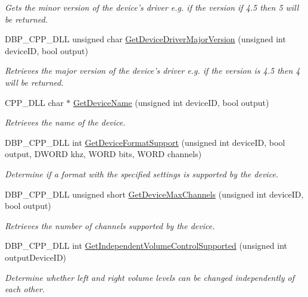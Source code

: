 \begin{DoxyCompactItemize}
\begin{DoxyCompactList}\small\item\em Gets the minor version of the device's driver e.g. if the version if 4.5 then 5 will be returned. \item\end{DoxyCompactList}\item 
DBP\_\-CPP\_\-DLL unsigned char \hyperlink{namespacemn_sound_a344981464c4ba19f43a4c2310a1369d5}{GetDeviceDriverMajorVersion} (unsigned int deviceID, bool output)
\begin{DoxyCompactList}\small\item\em Retrieves the major version of the device's driver e.g. if the version is 4.5 then 4 will be returned. \item\end{DoxyCompactList}\item 
CPP\_\-DLL char $\ast$ \hyperlink{namespacemn_sound_aaa57b089a6e0a2fabce97803657feda8}{GetDeviceName} (unsigned int deviceID, bool output)
\begin{DoxyCompactList}\small\item\em Retrieves the name of the device. \item\end{DoxyCompactList}\item 
DBP\_\-CPP\_\-DLL int \hyperlink{namespacemn_sound_ab3bf413b5a6ab630ca7e381e7b3d8bbc}{GetDeviceFormatSupport} (unsigned int deviceID, bool output, DWORD khz, WORD bits, WORD channels)
\begin{DoxyCompactList}\small\item\em Determine if a format with the specified settings is supported by the device. \item\end{DoxyCompactList}\item 
DBP\_\-CPP\_\-DLL unsigned short \hyperlink{namespacemn_sound_aaec6223600498262bb5e416ea3085857}{GetDeviceMaxChannels} (unsigned int deviceID, bool output)
\begin{DoxyCompactList}\small\item\em Retrieves the number of channels supported by the device. \item\end{DoxyCompactList}\item 
DBP\_\-CPP\_\-DLL int \hyperlink{namespacemn_sound_a601c73ad6a788881c1a7e599053db16a}{GetIndependentVolumeControlSupported} (unsigned int outputDeviceID)
\begin{DoxyCompactList}\small\item\em Determine whether left and right volume levels can be changed independently of each other. \item\end{DoxyCompactList}\item 

\end{DoxyCompactItemize}
